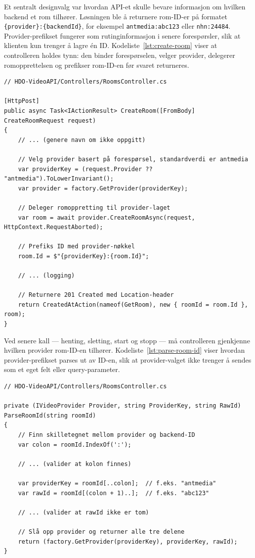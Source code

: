 Et sentralt designvalg var hvordan API-et skulle bevare informasjon om hvilken backend et rom tilhører. Løsningen ble å returnere rom-ID-er på formatet \texttt{\{provider\}:\{backendId\}}, for eksempel \texttt{antmedia:abc123} eller \texttt{nhn:24484}. Provider-prefikset fungerer som rutinginformasjon i senere forespørsler, slik at klienten kun trenger å lagre én ID. Kodeliste~\ref{lst:create-room} viser at controlleren holdes tynn: den binder forespørselen, velger provider, delegerer romopprettelsen og prefikser rom-ID-en før svaret returneres.
\begin{lstlisting}[language=CSharp, caption={Opprettelse av rom — controlleren delegerer til provider-laget.}, label={lst:create-room}]
// HDO-VideoAPI/Controllers/RoomsController.cs

[HttpPost]
public async Task<IActionResult> CreateRoom([FromBody] CreateRoomRequest request)
{
    // ... (genere navn om ikke oppgitt)

    // Velg provider basert på forespørsel, standardverdi er antmedia
    var providerKey = (request.Provider ?? "antmedia").ToLowerInvariant();
    var provider = factory.GetProvider(providerKey);

    // Deleger romoppretting til provider-laget
    var room = await provider.CreateRoomAsync(request, HttpContext.RequestAborted);

    // Prefiks ID med provider-nøkkel
    room.Id = $"{providerKey}:{room.Id}";

    // ... (logging)

    // Returnere 201 Created med Location-header
    return CreatedAtAction(nameof(GetRoom), new { roomId = room.Id }, room);
}
\end{lstlisting}

Ved senere kall — henting, sletting, start og stopp — må controlleren gjenkjenne hvilken provider rom-ID-en tilhører. Kodeliste~\ref{lst:parse-room-id} viser hvordan provider-prefikset parses ut av ID-en, slik at provider-valget ikke trenger å sendes som et eget felt eller query-parameter.

\begin{lstlisting}[language=CSharp, caption={Parsing av provider-prefiks fra rom-ID}, label={lst:parse-room-id}]
// HDO-VideoAPI/Controllers/RoomsController.cs

private (IVideoProvider Provider, string ProviderKey, string RawId) ParseRoomId(string roomId)
{
    // Finn skilletegnet mellom provider og backend-ID
    var colon = roomId.IndexOf(':');

    // ... (valider at kolon finnes)

    var providerKey = roomId[..colon];  // f.eks. "antmedia"
    var rawId = roomId[(colon + 1)..];  // f.eks. "abc123"

    // ... (valider at rawId ikke er tom)

    // Slå opp provider og returner alle tre delene
    return (factory.GetProvider(providerKey), providerKey, rawId);
}
\end{lstlisting}

